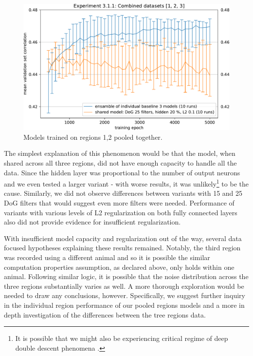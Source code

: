 \begin{figure}[H]
    \centering
    \includegraphics[width=1\textwidth]{../figures/05_3_1_1_2}
    \caption[Experiment 3.1.1 2]{Models trained on regions 1,2 pooled together\protect\footnotemark.}
    \label{fig:5.3.1.1_2}
\end{figure}

The simplest explanation of this phenomenon would be that the model, when shared across all three regions, did not have enough capacity to handle all the data. Since the hidden layer was proportional to the number of output neurons and we even tested a larger variant - with worse results, it was unlikely\footnote{It is possible that we might also be experiencing critical regime of deep double descent phenomena \citep{2019arXiv191202292N}.} to be the cause. Similarly, we did not observe differences between variants with 15 and 25 DoG filters that would suggest even more filters were needed. Performance of variants with various levels of L2 regularization on both fully connected layers also did not provide evidence for insufficient regularization. 

With insufficient model capacity and regularization out of the way, several data focused hypotheses explaining these results remained. Notably, the third region was recorded using a different animal and so it is possible the similar computation properties assumption, as declared above, only holds within one animal. Following similar logic, it is possible that the noise distribution across the three regions substantially varies as well. A more thorough exploration would be needed to draw any conclusions, however. Specifically, we suggest further inquiry in the individual region performance of our pooled regions models and a more in depth investigation of the differences between the tree regions data.

